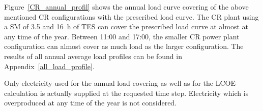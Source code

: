 Figure~\ref{CR_annual_profil} shows the annual load curve covering of the above mentioned CR configurations with the prescribed load curve. The CR plant using a SM of 3.5 and \SI{16}{h} of TES can cover the prescribed load curve at almost at any time of the year. Between 11:00 and 17:00, the smaller CR power plant configuration can almost cover as much load as the larger configuration. The results of all annual average load profiles can be found in Appendix~\ref{all_load_profile}.

Only electricity used for the annual load covering as well as for the LCOE calculation is actually supplied at the requested time step. Electricity which is overproduced at any time of the year is not considered. 

